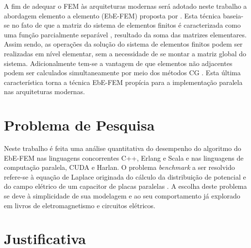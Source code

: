 \documentclass[
    12pt,               %
    openright,          %
    oneside,
    a4paper,            %
    english,            %
    french,             %
    spanish,            %
    brazil              %
    ]{abntex2}
\begin{document}
	A fim de adequar o FEM às arquiteturas modernas será adotado neste trabalho a abordagem elemento a elemento (EbE-FEM) proposta por . Esta técnica baseia-se no fato de que a matriz do sistema de elementos finitos é caracterizada como uma função parcialmente separável \cite{Dayde1995}, resultado da soma das matrizes elementares. Assim sendo, as operações da solução do sistema de elementos finitos podem ser realizadas em nível elementar, sem a necessidade de se montar a matriz global do sistema. Adicionalmente tem-se a vantagem de que elementos não adjacentes podem ser calculados simultaneamente por meio dos métodos CG \cite{Wathen1989}. Esta última característica torna a técnica EbE-FEM propícia para a implementação paralela nas arquiteturas modernas.
	
	
	

	
\section{Problema de Pesquisa}
	Neste trabalho é feita uma análise quantitativa do desempenho do algoritmo do EbE-FEM nas linguagens concorrentes C++, Erlang e Scala e nas linguagens de computação paralela, CUDA e Harlan.
	O problema \textit{benchmark} a ser resolvido refere-se à equação de Laplace originada do cálculo da distribuição de potencial e do campo elétrico de um capacitor de placas paralelas \cite[Exemplo 10.3]{boylestad2011}.
	A escolha deste problema se deve à simplicidade de sua modelagem e ao seu comportamento já explorado em livros de eletromagnetismo e circuitos elétricos.
	
	
\section{Justificativa}
\end{document}
